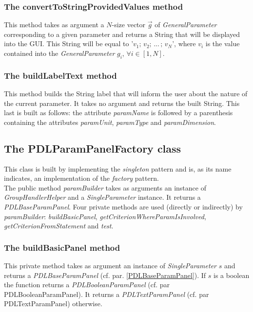 \documentclass[a4paper,11pt] {ivoa}
\begin{document}
\subsubsection{The convertToStringProvidedValues method}
This method takes as argument a $N$-size vector  $\vec g$ of {\it GeneralParameter} corresponding to a given parameter and returns a String that will be displayed into the GUI. This String will be equal to '$v_1; \, v_2; \,  ...\, ;\, v_N$', where $v_i$ is the value contained into the {\it GeneralParameter} $g_i$, $\forall i \in [1,N]$.

\subsubsection{The buildLabelText method}\label{buildLabelText}
This method builds the String label that will inform the user about the nature of the current parameter. It takes no argument and returns the built String. This last is built as follows: the attribute {\it paramName} is followed by a parenthesis containing  the attributes  {\it paramUnit}, {\it paramType} and {\it paramDimension}.

\subsection{The PDLParamPanelFactory class}
This class is built by implementing the {\it singleton} pattern and is, as its name indicates, an implementation of the {\it factory} pattern.\\
The public method {\it paramBuilder} takes as arguments an instance of {\it GroupHandlerHelper} and a {\it SingleParameter} instance. It returns a {\it PDLBaseParamPanel}. 
Four private methods are used (directly or indirectly) by  {\it paramBuilder}: {\it buildBasicPanel}, {\it getCriterionWhereParamIsInvolved}, {\it getCriterionFromStatement} and {\it test}.

\subsubsection{The buildBasicPanel method}
This private method takes as argument an instance of {\it SingleParameter} $s$ and returns a {\it PDLBaseParamPanel} (cf. par. \ref{PDLBaseParamPanel}). If $s$ is a boolean the function returns a {\it PDLBooleanParamPanel} (cf. par PDLBooleanParamPanel). It returns a {\it PDLTextParamPanel} (cf. par PDLTextParamPanel) otherwise.
\end{document}
